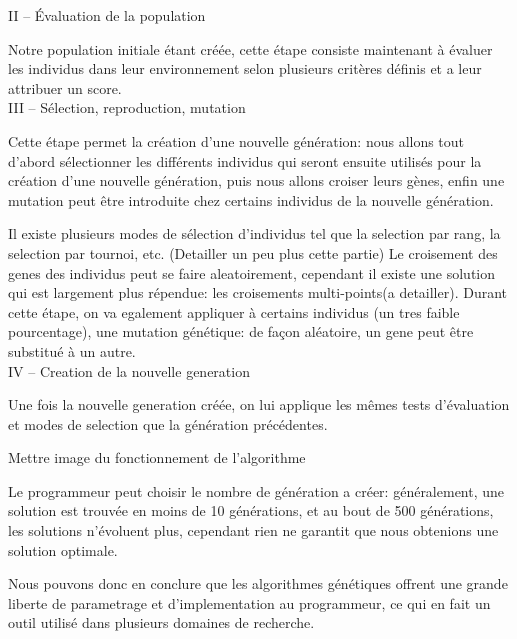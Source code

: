II – Évaluation de la population

	Notre population initiale étant créée, cette étape consiste maintenant à évaluer les individus dans leur environnement selon plusieurs critères définis et a leur attribuer un score.\\

III – Sélection, reproduction, mutation

	Cette étape permet la création d'une nouvelle génération: nous allons tout d'abord sélectionner les différents individus qui seront ensuite utilisés pour la création d'une nouvelle génération, puis nous allons croiser leurs gènes, enfin une mutation peut être introduite chez certains individus de la nouvelle génération.
 
	Il existe plusieurs modes de sélection d'individus tel que la selection par rang, la selection par tournoi, etc. (Detailler un peu plus cette partie)
	Le croisement des genes des individus peut se faire aleatoirement, cependant il existe une solution qui est largement plus répendue: les croisements multi-points(a detailler).
	Durant cette étape, on va egalement appliquer à certains individus (un tres faible pourcentage), une mutation génétique: de façon aléatoire, un gene peut être substitué à un autre.\\

IV – Creation de la nouvelle generation

	Une fois la nouvelle generation créée, on lui applique les mêmes tests d'évaluation et modes de selection que la génération précédentes.

Mettre image du fonctionnement de l'algorithme

Le programmeur peut choisir le nombre de génération a créer: généralement, une solution est trouvée en moins de 10 générations, et au bout de 500 générations, les solutions n'évoluent plus, cependant rien ne garantit que nous obtenions une solution optimale.

Nous pouvons donc en conclure que les algorithmes génétiques offrent une grande liberte de parametrage et d'implementation au programmeur, ce qui en fait un outil utilisé dans plusieurs domaines de recherche.


